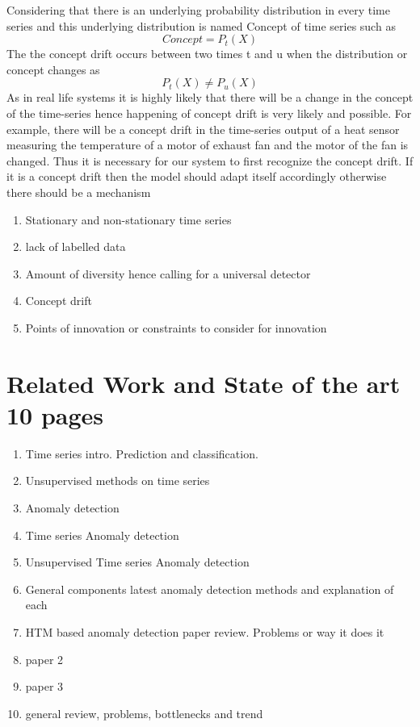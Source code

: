 \documentclass[12pt]{article}
\begin{document}
\break
Considering that there is an underlying probability distribution in every time series and this underlying distribution is named Concept of time series such as
\begin{equation}
Concept =  P_t(X)
\end{equation} 
The the concept drift occurs between two times t and u when the distribution or concept changes as
\begin{equation}
    P_t(X) \neq P_u(X)
\end{equation}
As in real life systems it is highly likely that there will be a change in the concept of the time-series hence happening of concept drift is very likely and possible. For example, there will be a concept drift in the time-series output of a heat sensor measuring the temperature of a motor of exhaust fan and the motor of the fan is changed. Thus it is necessary for our system to first recognize the concept drift. If it is a concept drift then the model should adapt itself accordingly otherwise there should be a mechanism 
\begin{enumerate}
	\item Stationary and non-stationary time series
	\item lack of labelled data
	\item Amount of diversity hence calling for a universal detector
	\item Concept drift
	\item Points of innovation or constraints to consider for innovation
\end{enumerate}
\newpage
\section{Related Work and State of the art 10 pages}
\begin{enumerate}
	\item Time series intro. Prediction and classification.
	\item Unsupervised methods on time series 
	\item Anomaly detection
	\item Time series Anomaly detection
	\item Unsupervised Time series Anomaly detection
	\item General components latest anomaly detection methods and explanation of each
	\item HTM based anomaly detection paper review. Problems or way it does it
	\item paper 2
	\item paper 3
	\item general review, problems, bottlenecks and trend
\end{enumerate}
\newpage
\end{document}
